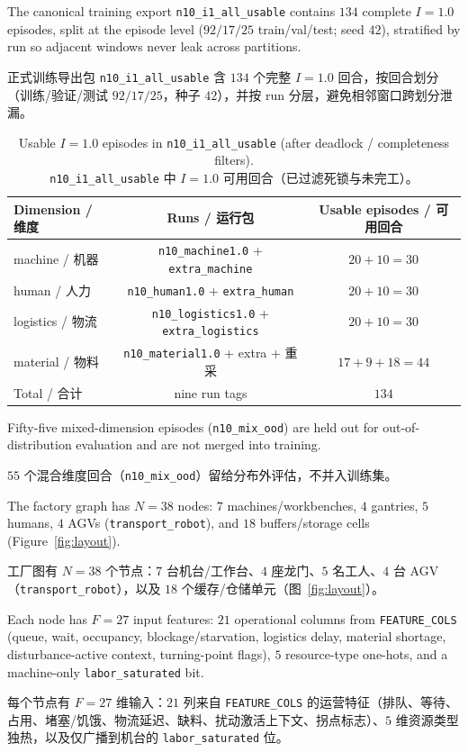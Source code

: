 \documentclass[12pt,a4paper,oneside,scheme=plain]{ctexrep}
\newcommand{\bip}[2]{%
  \par #1\par
  \nobreak\vspace{0.12em}%
  {\small\color{black!62}#2}\par
  \vspace{0.62em}%
}
\begin{document}
\bip
{The canonical training export \texttt{n10\_i1\_all\_usable} contains $134$ complete $I=1.0$ episodes, split at the episode level ($92/17/25$ train/val/test; seed $42$), stratified by run so adjacent windows never leak across partitions.}
{正式训练导出包 \texttt{n10\_i1\_all\_usable} 含 $134$ 个完整 $I=1.0$ 回合，按回合划分（训练/验证/测试 $92/17/25$，种子 $42$），并按 run 分层，避免相邻窗口跨划分泄漏。}

\begin{table}[ht]
\centering
\caption{Usable $I=1.0$ episodes in \texttt{n10\_i1\_all\_usable} (after deadlock / completeness filters).\\
{\small \texttt{n10\_i1\_all\_usable} 中 $I=1.0$ 可用回合（已过滤死锁与未完工）。}}
\label{tab:dataset}
\begin{tabular}{lcc}
\toprule
Dimension / 维度 & Runs / 运行包 & Usable episodes / 可用回合 \\
\midrule
machine / 机器 & \texttt{n10\_machine1.0} + \texttt{extra\_machine} & $20+10=30$ \\
human / 人力 & \texttt{n10\_human1.0} + \texttt{extra\_human} & $20+10=30$ \\
logistics / 物流 & \texttt{n10\_logistics1.0} + \texttt{extra\_logistics} & $20+10=30$ \\
material / 物料 & \texttt{n10\_material1.0} + extra + 重采 & $17+9+18=44$ \\
\midrule
Total / 合计 & nine run tags & $134$ \\
\bottomrule
\end{tabular}
\end{table}

\bip
{Fifty-five mixed-dimension episodes (\texttt{n10\_mix\_ood}) are held out for out-of-distribution evaluation and are not merged into training.}
{$55$ 个混合维度回合（\texttt{n10\_mix\_ood}）留给分布外评估，不并入训练集。}

\bip
{The factory graph has $N=38$ nodes: $7$ machines/workbenches, $4$ gantries, $5$ humans, $4$ AGVs (\texttt{transport\_robot}), and $18$ buffers/storage cells (Figure~\ref{fig:layout}).}
{工厂图有 $N=38$ 个节点：$7$ 台机台/工作台、$4$ 座龙门、$5$ 名工人、$4$ 台 AGV（\texttt{transport\_robot}），以及 $18$ 个缓存/仓储单元（图~\ref{fig:layout}）。}

\bip
{Each node has $F=27$ input features: $21$ operational columns from \texttt{FEATURE\_COLS} (queue, wait, occupancy, blockage/starvation, logistics delay, material shortage, disturbance-active context, turning-point flags), $5$ resource-type one-hots, and a machine-only \texttt{labor\_saturated} bit.}
{每个节点有 $F=27$ 维输入：$21$ 列来自 \texttt{FEATURE\_COLS} 的运营特征（排队、等待、占用、堵塞/饥饿、物流延迟、缺料、扰动激活上下文、拐点标志）、$5$ 维资源类型独热，以及仅广播到机台的 \texttt{labor\_saturated} 位。}
\end{document}
